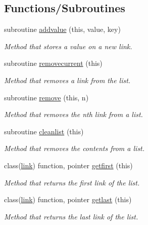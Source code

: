 \subsection*{Functions/\+Subroutines}
\begin{DoxyCompactItemize}
\item 
subroutine \mbox{\hyperlink{namespaceabstract__linkedlist__mod_a1075e2f234dacc9daf8407e14fac0929}{addvalue}} (this, value, key)
\begin{DoxyCompactList}\small\item\em Method that stores a value on a new link. \end{DoxyCompactList}\item 
subroutine \mbox{\hyperlink{namespaceabstract__linkedlist__mod_ae725ed63dd3b08d29e1c4ff824e05589}{removecurrent}} (this)
\begin{DoxyCompactList}\small\item\em Method that removes a link from the list. \end{DoxyCompactList}\item 
subroutine \mbox{\hyperlink{namespaceabstract__linkedlist__mod_a9f4028744d1ca6536e28c76d2795ace3}{remove}} (this, n)
\begin{DoxyCompactList}\small\item\em Method that removes the nth link from a list. \end{DoxyCompactList}\item 
subroutine \mbox{\hyperlink{namespaceabstract__linkedlist__mod_a09300e2f8301965a7137cdd60a3b7ac7}{cleanlist}} (this)
\begin{DoxyCompactList}\small\item\em Method that removes the contents from a list. \end{DoxyCompactList}\item 
class(\mbox{\hyperlink{structlink__mod_1_1link}{link}}) function, pointer \mbox{\hyperlink{namespaceabstract__linkedlist__mod_ad7b7ffee891627ae2b0548001650f72b}{getfirst}} (this)
\begin{DoxyCompactList}\small\item\em Method that returns the first link of the list. \end{DoxyCompactList}\item 
class(\mbox{\hyperlink{structlink__mod_1_1link}{link}}) function, pointer \mbox{\hyperlink{namespaceabstract__linkedlist__mod_a7c0a2e5b554e8859fc9b4d8fb52b124f}{getlast}} (this)
\begin{DoxyCompactList}\small\item\em Method that returns the last link of the list. \end{DoxyCompactList}\item 

\end{DoxyCompactItemize}
